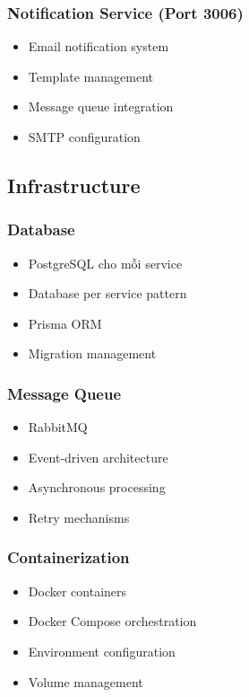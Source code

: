 \documentclass[12pt,a4paper]{report}
\begin{document}
\subsubsection{Notification Service (Port 3006)}
\begin{itemize}
    \item Email notification system
    \item Template management
    \item Message queue integration
    \item SMTP configuration
\end{itemize}

\subsection{Infrastructure}
\subsubsection{Database}
\begin{itemize}
    \item PostgreSQL cho mỗi service
    \item Database per service pattern
    \item Prisma ORM
    \item Migration management
\end{itemize}

\subsubsection{Message Queue}
\begin{itemize}
    \item RabbitMQ
    \item Event-driven architecture
    \item Asynchronous processing
    \item Retry mechanisms
\end{itemize}

\subsubsection{Containerization}
\begin{itemize}
    \item Docker containers
    \item Docker Compose orchestration
    \item Environment configuration
    \item Volume management
\end{itemize}
\end{document}
